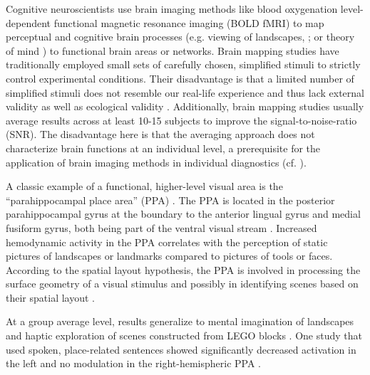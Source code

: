 \documentclass[english]{article}
\begin{document}
Cognitive neuroscientists use brain imaging methods like blood oxygenation
level-dependent functional magnetic resonance imaging (BOLD fMRI) to map
perceptual and cognitive brain processes (e.g. viewing of landscapes,
\citep{epstein1998ppa}; or theory of mind \citep{spunt2014validating}) to
functional brain areas or networks.
Brain mapping studies have traditionally employed small sets of carefully
chosen, simplified stimuli to strictly control experimental conditions.
Their disadvantage is that a limited number of simplified stimuli does not
resemble our real-life experience and thus lack external validity
\citep{westfall2016fixing} as well as ecological validity
\citep{hasson2004intersubject}.
Additionally, brain mapping studies usually average results across at least
10-15 subjects to improve the signal-to-noise-ratio (SNR). The disadvantage here
is that the averaging approach does not characterize brain functions at an
individual level, a prerequisite for the application of brain imaging methods in
individual diagnostics (cf. \citep{dubois2016building, eickhoff2020towards}).


A classic example of a functional, higher-level visual area is the
``parahippocampal place area'' (PPA) \citep{epstein1998ppa,
epstein1999parahippocampal}.
The PPA is located in the posterior parahippocampal gyrus at the boundary to the
anterior lingual gyrus and medial fusiform gyrus, both being part of the ventral
visual stream \citep{mishkin1982contribution, goodale1992separate}.
Increased hemodynamic activity in the PPA correlates with the perception of
static pictures of landscapes or landmarks compared to pictures of tools or
faces.
According to the spatial layout hypothesis, the PPA is involved in
processing the surface geometry of a visual stimulus and possibly in identifying
scenes based on their spatial layout \citep{epstein2010reliable}.

At a group average level, results generalize to mental imagination of landscapes
\citep{ocraven2000mental} and haptic exploration of scenes constructed from LEGO
blocks \citep{wolbers2011modality}.
One study that used spoken, place-related sentences showed significantly
decreased activation in the left and no modulation in the right-hemispheric PPA
\citep{aziz2008modulation}.
\end{document}
